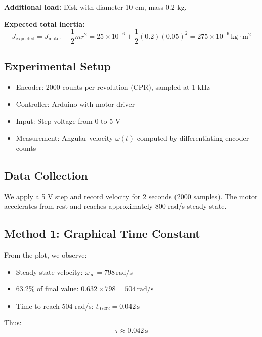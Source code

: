\textbf{Additional load:} Disk with diameter 10 cm, mass 0.2 kg.

\textbf{Expected total inertia:}
\begin{equation}
J_{\text{expected}} = J_{\text{motor}} + \frac{1}{2}mr^2 = 25\times10^{-6} + \frac{1}{2}(0.2)(0.05)^2 = 275 \times 10^{-6} \, \text{kg}\cdot\text{m}^2
\end{equation}

\subsection{Experimental Setup}

\begin{itemize}
    \item Encoder: 2000 counts per revolution (CPR), sampled at 1 kHz
    \item Controller: Arduino with motor driver
    \item Input: Step voltage from 0 to 5 V
    \item Measurement: Angular velocity $\omega(t)$ computed by differentiating encoder counts
\end{itemize}

\subsection{Data Collection}

We apply a 5 V step and record velocity for 2 seconds (2000 samples). The motor accelerates from rest and reaches approximately 800 rad/s steady state.

\subsection{Method 1: Graphical Time Constant}

From the plot, we observe:
\begin{itemize}
    \item Steady-state velocity: $\omega_{\infty} = 798 \, \text{rad/s}$
    \item 63.2\% of final value: $0.632 \times 798 = 504 \, \text{rad/s}$
    \item Time to reach 504 rad/s: $t_{0.632} = 0.042 \, \text{s}$
\end{itemize}

Thus:
\begin{equation}
\tau \approx 0.042 \, \text{s}
\end{equation}

